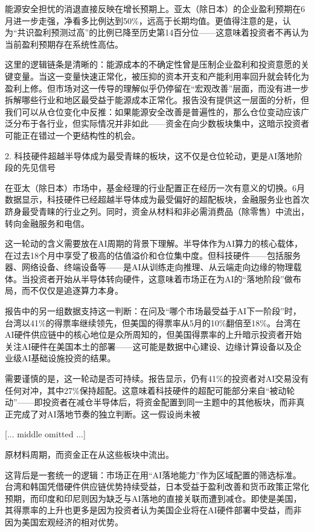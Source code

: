 \documentclass[11pt]{ctexart}
\begin{document}
能源安全担忧的消退直接反映在增长预期上。亚太（除日本）的企业盈利预期在6月进一步走强，净看多比例达到50\%，远高于长期均值。更值得注意的是，认为“共识盈利预测过高”的比例已降至历史第14百分位——这意味着投资者不再认为当前盈利预期存在系统性高估。

这里的逻辑链条是清晰的：能源成本的不确定性曾是压制企业盈利和投资意愿的关键变量。当这一变量快速正常化，被压抑的资本开支和产能利用率回升就会转化为盈利上修。但市场对这一传导的理解似乎仍停留在“宏观改善”层面，而没有进一步拆解哪些行业和地区最受益于能源成本正常化。报告没有提供这一层面的分析，但我们可以从仓位变化中反推：如果能源安全改善是普遍性的，那么仓位变动应该广泛分布于各行业，但实际情况并非如此——资金在向少数板块集中，这暗示投资者可能正在错过一个更结构性的机会。

2. 科技硬件超越半导体成为最受青睐的板块，这不仅是仓位轮动，更是AI落地阶段的先见信号

在亚太（除日本）市场中，基金经理的行业配置正在经历一次有意义的切换。6月数据显示，科技硬件已经超越半导体成为最受偏好的超配板块，金融服务业也首次跻身最受青睐的行业之列。同时，资金从材料和非必需消费品（除零售）中流出，转向金融服务和电信。

这一轮动的含义需要放在AI周期的背景下理解。半导体作为AI算力的核心载体，在过去18个月中享受了极高的估值溢价和仓位集中度。但科技硬件——包括服务器、网络设备、终端设备等——是AI从训练走向推理、从云端走向边缘的物理载体。当投资者开始从半导体转向硬件，这意味着市场正在为AI的“落地阶段”做布局，而不仅仅是追逐算力本身。

报告中的另一组数据支持这一判断：在问及“哪个市场最受益于AI下一阶段”时，台湾以41\%的得票率继续领先，但美国的得票率从5月的10\%翻倍至18\%。台湾在AI硬件供应链中的核心地位是众所周知的，但美国得票率的上升暗示投资者开始关注AI硬件在美国本土的部署——这可能是数据中心建设、边缘计算设备以及企业级AI基础设施投资的结果。

需要谨慎的是，这一轮动是否可持续。报告显示，仍有41\%的投资者对AI交易没有任何对冲，其中27\%保持超配。这意味着科技硬件的超配可能部分来自“被动轮动”——即投资者在减仓半导体后，将资金配置到同一主题中的其他板块，而非真正完成了对AI落地节奏的独立判断。这一假设尚未被

[... middle omitted ...]

原材料周期，而资金正在从这些板块中流出。

这背后是一套统一的逻辑：市场正在用“AI落地能力”作为区域配置的筛选标准。台湾和韩国凭借硬件供应链优势持续受益，日本受益于盈利改善和货币政策正常化预期，而印度和印尼则因为缺乏与AI落地的直接关联而遭到减仓。即使是美国，其得票率的上升也更多是因为投资者认为美国企业将在AI硬件部署中受益，而非因为美国宏观经济的相对优势。
\end{document}
